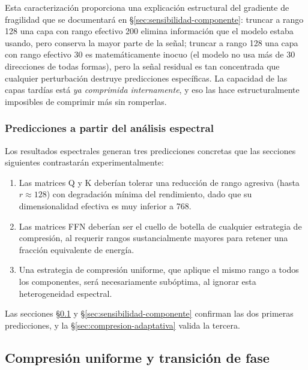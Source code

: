 Esta caracterización proporciona una explicación estructural del gradiente
de fragilidad que se documentará en \S\ref{sec:sensibilidad-componente}:
truncar a rango 128 una capa con rango efectivo 200 elimina información
que el modelo estaba usando, pero conserva la mayor parte de la señal;
truncar a rango 128 una capa con rango efectivo 30 es matemáticamente
inocuo (el modelo no usa más de 30 direcciones de todas formas), pero
la señal residual es tan concentrada que cualquier perturbación destruye
predicciones específicas. La capacidad de las capas tardías está
\emph{ya comprimida internamente}, y eso las hace estructuralmente
imposibles de comprimir más sin romperlas.


\subsubsection{Predicciones a partir del análisis espectral}

Los resultados espectrales generan tres predicciones concretas que las secciones
siguientes contrastarán experimentalmente:

\begin{enumerate}[nosep]
    \item Las matrices Q y K deberían tolerar una reducción de rango agresiva (hasta
    $r \approx 128$) con degradación mínima del rendimiento, dado que su dimensionalidad
    efectiva es muy inferior a 768.

    \item Las matrices FFN deberían ser el cuello de botella de cualquier estrategia de
    compresión, al requerir rangos sustancialmente mayores para retener una fracción
    equivalente de energía.

    \item Una estrategia de compresión uniforme, que aplique el mismo rango a todos los
    componentes, será necesariamente subóptima, al ignorar esta heterogeneidad espectral.
\end{enumerate}

Las secciones \S\ref{sec:compresion-uniforme} y \S\ref{sec:sensibilidad-componente}
confirman las dos primeras predicciones, y la \S\ref{sec:compresion-adaptativa} valida
la tercera.



\subsection{Compresión uniforme y transición de fase}
\label{sec:compresion-uniforme}


